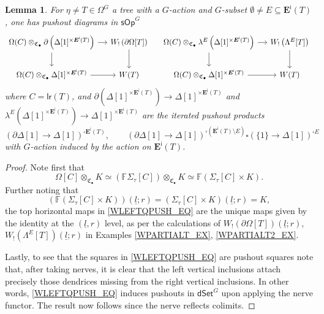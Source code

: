 \documentclass[a4paper,10pt]{article}%
\numberwithin{equation}{section}
\numberwithin{figure}{section}
\newtheorem{lemma}[equation]{Lemma}%
\theoremstyle{definition} %
\newcommand{\sOp}{\ensuremath{\mathsf{sOp}}}%
\newcommand{\1}{\ensuremath{\mathbbm 1}}%
\begin{document}
\begin{lemma}\label{WLEFTQPUSH LEM}
      For $\eta \neq T \in \Omega^G$
      a tree with a $G$-action
      and $G$-subset $\emptyset \neq E \subseteq \boldsymbol{E}^{\mathsf{i}}(T)$,
      one has pushout diagrams in $\sOp^G$
\begin{equation}\label{WLEFTQPUSH_EQ}
\begin{tikzcd}[column sep = small]
	\Omega(C) \otimes_{\mathfrak C_\bullet}
	\partial \left(\Delta[1]^{\times \boldsymbol{E}^{\mathsf{i}}(T)}\right)
	\ar{r} \ar{d}
&
	W_! \left(\partial \Omega[T]\right) 
	\arrow[d]
& %
	\Omega(C) \otimes_{\mathfrak C_\bullet}
	\lambda^E \left(
	\Delta[1]^{\times \boldsymbol{E}^{\mathsf{i}}(T)}
	\right)
	\ar{r} \ar{d}
&
	W_! \left(\Lambda^E[T]\right) 
	\arrow[d]
\\
	\Omega(C) \otimes_{\mathfrak C_\bullet}
	\Delta[1]^{\times \boldsymbol{E}^{\mathsf{i}}(T)}
	\ar{r}
&
	W(T)
& %
	\Omega(C) \otimes_{\mathfrak C_\bullet}
	\Delta[1]^{\times \boldsymbol{E}^{\mathsf{i}}(T)}
	\ar{r}
&
	W(T)
\end{tikzcd}
\end{equation}
      where
      $C = \mathsf{lr}(T)$, and
      $\partial \left(\Delta[1]^{\times \boldsymbol{E}^{\mathsf{i}}(T)}\right)
      \to
      \Delta[1]^{\times \boldsymbol{E}^{\mathsf{i}}(T)}$
      and
      $\lambda^E
      \left(
      \Delta[1]^{\times \boldsymbol{E}^{\mathsf{i}}(T)}
      \right)
      \to \Delta[1]^{\times \boldsymbol{E}^{\mathsf{i}}(T)}$
      are the iterated pushout products
\[
	\left(
	\partial\Delta[1] \to \Delta[1]
	\right)^{\square \boldsymbol E^{\mathsf{i}}(T)},
\qquad
	\left(
	\partial \Delta[1] \to \Delta[1]
	\right)^{\square (\boldsymbol{E}^{\mathsf{i}}(T) \setminus E)}
	\square
	\left(
	\{1\} \to \Delta[1]
	\right)^{\square E}
\]
      with $G$-action induced by the action on $\boldsymbol{E}^{\mathsf{i}}(T)$.
\end{lemma}




\begin{proof}
	Note first that
\[\Omega[C] \otimes_{\mathfrak{C}_{\bullet}} K
\simeq
\left(
\mathbb{F} \Sigma_{\tau}[C]	
\right)	\otimes_{\mathfrak{C}_{\bullet}} K
\simeq
\mathbb{F} (\Sigma_{\tau}[C] \times K).\]
Further noting that
\[
\left(\mathbb{F} (\Sigma_{\tau}[C] \times K)\right)(\underline{l};r) =
(\Sigma_{\tau}[C] \times K)(\underline{l};r) = K,
\]
the top horizontal maps in 
\eqref{WLEFTQPUSH_EQ}
are the unique maps given by the identity at the 
$(\underline{l},r)$ level,
as per the calculations of
$W_!\left(\partial \Omega[T] \right)(\underline{l};r)$,
$W_!\left(\Lambda^E[T] \right)(\underline{l};r)$
in Examples \ref{WPARTIALT_EX}, \ref{WPARTIALT2_EX}.

Lastly, to see that the squares in
\eqref{WLEFTQPUSH_EQ} are pushout squares note that,
after taking nerves, it is clear that the left vertical inclusions attach precisely those dendrices 
missing from the right vertical inclusions.
In other words, \eqref{WLEFTQPUSH_EQ}
induces pushouts in $\mathsf{dSet}^G$ upon applying the nerve functor.
The result now follows since the nerve reflects colimits.
\end{proof}
\end{document}

